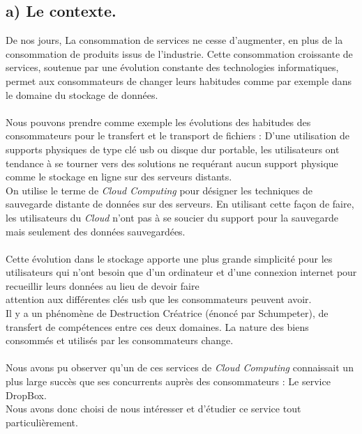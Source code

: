 \documentclass[a4paper, 10pt]{article}
\begin{document}
\subsection*{a) Le contexte.}
De nos jours, La consommation de services ne cesse d'augmenter, en plus de la consommation de produits issus de l'industrie.
Cette consommation croissante de services, soutenue par une \'evolution constante des technologies informatiques, permet aux consommateurs
de changer leurs habitudes comme par exemple dans le domaine du stockage de donn\'ees.\\ \\
Nous pouvons prendre comme exemple les \'evolutions des habitudes des consommateurs pour le transfert et le transport de fichiers :
D'une utilisation de supports physiques de type cl\'e usb ou disque dur portable, les utilisateurs ont tendance \`a se tourner vers des solutions
ne requ\'erant aucun support physique comme le stockage en ligne sur des serveurs distants.\\
On utilise le terme de \textit{Cloud Computing} pour d\'esigner les techniques de sauvegarde distante de donn\'ees sur des serveurs.
En utilisant cette façon de faire, les utilisateurs du \textit{Cloud} n'ont pas \`a se soucier du support pour la sauvegarde mais
seulement des donn\'ees sauvegard\'ees.\\ \\
Cette \'evolution dans le stockage apporte une plus grande simplicit\'e pour les utilisateurs
qui n'ont besoin que d'un ordinateur et d'une connexion internet pour recueillir leurs donn\'ees
au lieu de devoir faire\\attention aux diff\'erentes cl\'es usb que les consommateurs peuvent avoir.\\
Il y a un ph\'enom\`ene de Destruction Cr\'eatrice (\'enonc\'e par Schumpeter), de transfert de comp\'etences entre ces deux domaines.
La nature des biens consomm\'es et utilis\'es par les consommateurs change.\\ \\
Nous avons pu observer qu'un de ces services de \textit{Cloud Computing} connaissait un plus large succ\`es
que ses concurrents aupr\`es des consommateurs : Le service DropBox.\\
Nous avons donc choisi de nous int\'eresser et d'\'etudier ce service tout particuli\`erement.\\ \\
\end{document}
